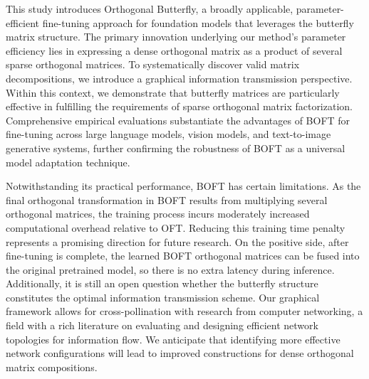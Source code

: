 This study introduces Orthogonal Butterfly, a broadly applicable, parameter-efficient fine-tuning approach for foundation models that leverages the butterfly matrix structure. The primary innovation underlying our method's parameter efficiency lies in expressing a dense orthogonal matrix as a product of several sparse orthogonal matrices. To systematically discover valid matrix decompositions, we introduce a graphical information transmission perspective. Within this context, we demonstrate that butterfly matrices are particularly effective in fulfilling the requirements of sparse orthogonal matrix factorization. Comprehensive empirical evaluations substantiate the advantages of BOFT for fine-tuning across large language models, vision models, and text-to-image generative systems, further confirming the robustness of BOFT as a universal model adaptation technique.

Notwithstanding its practical performance, BOFT has certain limitations. As the final orthogonal transformation in BOFT results from multiplying several orthogonal matrices, the training process incurs moderately increased computational overhead relative to OFT. Reducing this training time penalty represents a promising direction for future research. On the positive side, after fine-tuning is complete, the learned BOFT orthogonal matrices can be fused into the original pretrained model, so there is no extra latency during inference. Additionally, it is still an open question whether the butterfly structure constitutes the optimal information transmission scheme. Our graphical framework allows for cross-pollination with research from computer networking, a field with a rich literature on evaluating and designing efficient network topologies for information flow. We anticipate that identifying more effective network configurations will lead to improved constructions for dense orthogonal matrix compositions.

